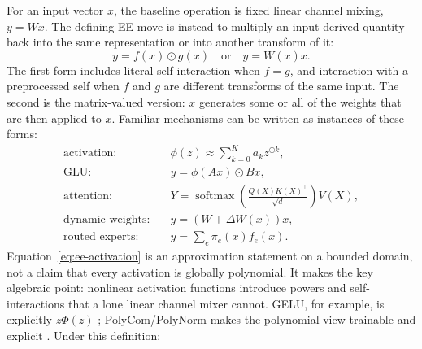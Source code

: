 \documentclass[10pt]{article}
\begin{document}
For an input vector $x$, the baseline operation is fixed linear channel mixing,
$y=Wx$.  The defining EE move is instead to multiply an input-derived quantity
back into the same representation or into another transform of it:
\begin{equation}
  y = f(x) \odot g(x)
  \quad\text{or}\quad
  y = W(x)x.
  \label{eq:ee-primitive}
\end{equation}
The first form includes literal self-interaction when $f=g$, and interaction
with a preprocessed self when $f$ and $g$ are different transforms of the same
input.  The second is the matrix-valued version: $x$ generates some or all of
the weights that are then applied to $x$.  Familiar mechanisms can be written
as instances of these forms:
\begin{align}
  \text{activation:}\quad
    &\phi(z) \approx \sum_{k=0}^{K} a_k z^{\odot k},
    \label{eq:ee-activation}\\
  \text{GLU:}\quad
    &y = \phi(Ax) \odot Bx,
    \label{eq:ee-glu}\\
  \text{attention:}\quad
    &Y = \operatorname{softmax}\!\left(\frac{Q(X)K(X)^\top}{\sqrt{d}}\right)V(X),
    \label{eq:ee-attention}\\
  \text{dynamic weights:}\quad
    &y = \left(W + \Delta W(x)\right)x,
    \label{eq:ee-hyper}\\
  \text{routed experts:}\quad
    &y = \sum_e \pi_e(x) f_e(x).
  \label{eq:ee-family}
\end{align}
Equation~\ref{eq:ee-activation} is an approximation statement on a bounded
domain, not a claim that every activation is globally polynomial.  It makes
the key algebraic point: nonlinear activation functions introduce powers and
self-interactions that a lone linear channel mixer cannot.  GELU, for example,
is explicitly $z\Phi(z)$ \citep{hendrycks2016gelu}; PolyCom/PolyNorm makes the
polynomial view trainable and explicit \citep{zhuo2024polycom}.  Under this
definition:
\end{document}
